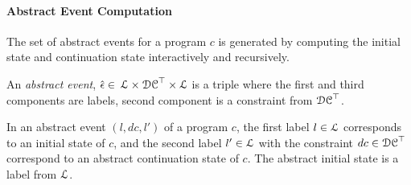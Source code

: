  \paragraph{Abstract Event Computation} 
 The set of abstract events for a program $c$ is generated by computing the initial state and continuation state interactively and recursively.
 \begin{defn}
 \label{def:adaptfun-abs_event}
 An \emph{abstract event},
 $\hat{\mathtt{\epsilon}{}} \in $
 $\mathcal{L} \times \mathcal{DC}^{\top} \times \mathcal{L}$
 is a 
 triple where the first and third components are labels,
 second component is a constraint from $\mathcal{DC}^{\top}$.
 \end{defn}
 In an abstract event $(l, dc, l')$ of a program $c$, 
 the first label $l \in \mathcal{L}$ corresponds to an initial state of $c$, and 
 the second label $l' \in \mathcal{L}$ with the constraint $dc \in \mathcal{DC}^{\top}$ correspond to an abstract continuation state of $c$.
 The abstract initial state is a label from $\mathcal{L}$.

